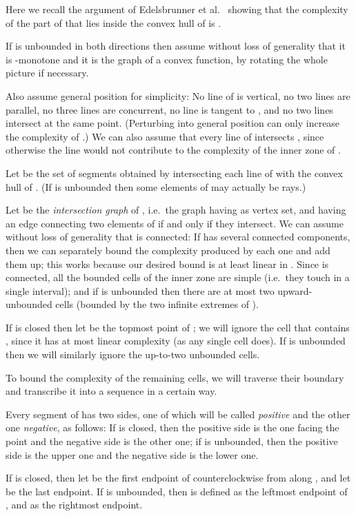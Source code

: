 \documentclass[11pt]{article}
\theoremstyle{definition}
\theoremstyle{remark}
\begin{document}
Here we recall the argument of Edelsbrunner et al.~\cite{EGPPSS} showing that the complexity of the part of  that lies inside the convex hull of  is .

If  is unbounded in both directions then assume without loss of generality that it is -monotone and it is the graph of a convex function, by rotating the whole picture if necessary.

Also assume general position for simplicity: No line of  is vertical, no two lines are parallel, no three lines are concurrent, no line is tangent to , and no two lines intersect  at the same point. (Perturbing  into general position can only increase the complexity of .) We can also assume that every line of  intersects , since otherwise the line would not contribute to the complexity of the inner zone of .

Let  be the set of  segments obtained by intersecting each line of  with the convex hull of . (If  is unbounded then some elements of  may actually be rays.)

Let  be the \emph{intersection graph} of , i.e.~the graph having  as vertex set, and having an edge connecting two elements of  if and only if they intersect. We can assume without loss of generality that  is connected: If  has several connected components, then we can separately bound the complexity produced by each one and add them up; this works because our desired bound is at least linear in . Since  is connected, all the bounded cells of the inner zone are simple (i.e.~they touch  in a single interval); and if  is unbounded then there are at most two upward-unbounded cells (bounded by the two infinite extremes of ).

If  is closed then let  be the topmost point of ; we will ignore the cell that contains , since it has at most linear complexity (as any single cell does). If  is unbounded then we will similarly ignore the up-to-two unbounded cells.

To bound the complexity of the remaining cells, we will traverse their boundary and transcribe it into a sequence in a certain way.

Every segment of  has two sides, one of which will be called \emph{positive} and the other one \emph{negative}, as follows: If  is closed, then the positive side is the one facing the point  and the negative side is the other one; if  is unbounded, then the positive side is the upper one and the negative side is the lower one.

If  is closed, then let  be the first endpoint of  counterclockwise from  along , and let  be the last endpoint. If  is unbounded, then  is defined as the leftmost endpoint of , and  as the rightmost endpoint.
\end{document}

